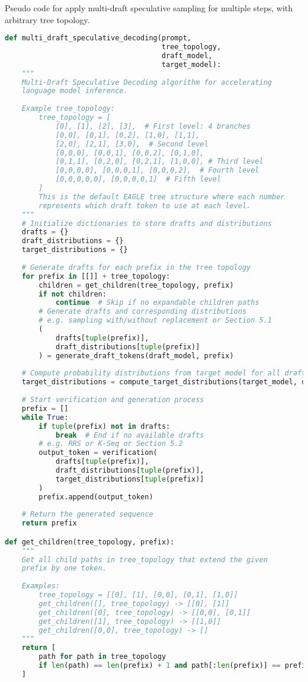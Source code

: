 \documentclass{article}
\begin{document}
Pseudo code for apply multi-draft speculative sampling for multiple steps, with arbitrary tree topology.
\begin{lstlisting}[language=Python]
def multi_draft_speculative_decoding(prompt,
                                     tree_topology, 
                                     draft_model, 
                                     target_model):
    """
    Multi-Draft Speculative Decoding algorithm for accelerating
    language model inference.
   
    Example tree_topology:
        tree_topology = [
            [0], [1], [2], [3],  # First level: 4 branches
            [0,0], [0,1], [0,2], [1,0], [1,1], 
            [2,0], [2,1], [3,0],  # Second level
            [0,0,0], [0,0,1], [0,0,2], [0,1,0], 
            [0,1,1], [0,2,0], [0,2,1], [1,0,0], # Third level
            [0,0,0,0], [0,0,0,1], [0,0,0,2],  # Fourth level
            [0,0,0,0,0], [0,0,0,0,1]  # Fifth level
        ]
        This is the default EAGLE tree structure where each number 
        represents which draft token to use at each level.
    """
    # Initialize dictionaries to store drafts and distributions
    drafts = {}
    draft_distributions = {}
    target_distributions = {}
   
    # Generate drafts for each prefix in the tree topology
    for prefix in [[]] + tree_topology:
        children = get_children(tree_topology, prefix)
        if not children:
            continue  # Skip if no expandable children paths
        # Generate drafts and corresponding distributions
        # e.g. sampling with/without replacement or Section 5.1
        (
            drafts[tuple(prefix)], 
            draft_distributions[tuple(prefix)]
        ) = generate_draft_tokens(draft_model, prefix)
   
    # Compute probability distributions from target model for all drafts
    target_distributions = compute_target_distributions(target_model, drafts)
   
    # Start verification and generation process
    prefix = []
    while True:
        if tuple(prefix) not in drafts:
            break  # End if no available drafts
        # e.g. RRS or K-Seq or Section 5.2
        output_token = verification(
            drafts[tuple(prefix)],
            draft_distributions[tuple(prefix)],
            target_distributions[tuple(prefix)]
        )
        prefix.append(output_token)
   
    # Return the generated sequence
    return prefix

def get_children(tree_topology, prefix):
    """
    Get all child paths in tree_topology that extend the given
    prefix by one token.
   
    Examples:
        tree_topology = [[0], [1], [0,0], [0,1], [1,0]]
        get_children([], tree_topology) -> [[0], [1]]
        get_children([0], tree_topology) -> [[0,0], [0,1]]
        get_children([1], tree_topology) -> [[1,0]]
        get_children([0,0], tree_topology) -> []
    """
    return [
        path for path in tree_topology
        if len(path) == len(prefix) + 1 and path[:len(prefix)] == prefix
    ]
\end{lstlisting}
\end{document}
